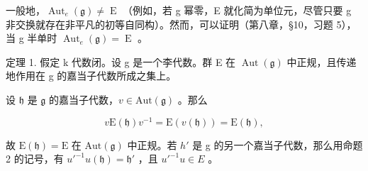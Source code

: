 一般地，\(\operatorname{Aut}_{e}(\mathfrak{g}) \neq \operatorname{E}\) （例如，若 g 幂零，E 就化简为单位元，尽管只要 g 非交换就存在非平凡的初等自同构）。然而，可以证明（第八章，§10，习题 5），当 g 半单时 \(\operatorname{Aut}_{e}(\mathfrak{g}) = \operatorname{E}\) 。

定理 1. 假定 k 代数闭。设 g 是一个李代数。群 E 在 \(\operatorname{Aut}(\mathfrak{g})\) 中正规，且传递地作用在 g 的嘉当子代数所成之集上。

设 \(\mathfrak{h}\) 是 \(\mathfrak{g}\) 的嘉当子代数，\(v\in\mathrm{Aut}(\mathfrak{g})\) 。那么

\[
v \mathrm{E} (\mathfrak {h}) v ^ {- 1} = \mathrm{E} (v (\mathfrak {h})) = \mathrm{E} (\mathfrak {h}),
\]

故 \(\mathrm{E}(\mathfrak{h}) = \mathrm{E}\) 在 \(\mathrm{Aut}(\mathfrak{g})\) 中正规。若 \(h'\) 是 g 的另一个嘉当子代数，那么用命题 2 的记号，有 \(u'^{-1}u(\mathfrak{h}) = \mathfrak{h}'\) ，且 \(u'^{-1}u \in E\) 。

